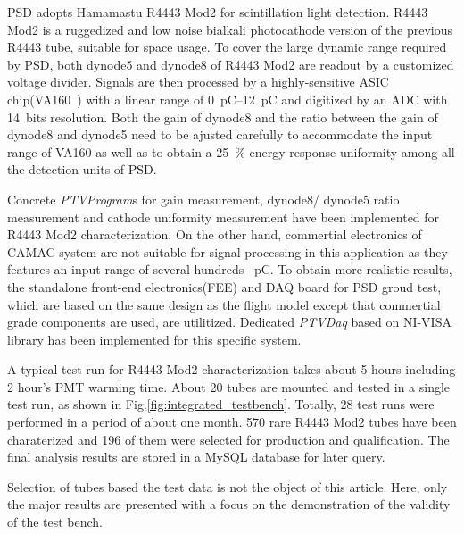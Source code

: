\documentclass[5p, times]{elsarticle}
\begin{document}
PSD adopts Hamamastu R4443 Mod2 for scintillation light detection.
R4443 Mod2 is a ruggedized and low noise bialkali photocathode version of the previous R4443 tube, suitable for space usage. 
To cover the large dynamic range required by PSD, both dynode5 and dynode8 of R4443 Mod2 are readout by a customized voltage divider.
Signals are then processed by a highly-sensitive ASIC chip(VA160~\cite{va160}) with a linear range of \SIrange{0}{12}{\pico\coulomb} and digitized by an ADC with 14~bits resolution.
Both the gain of dynode8 and the ratio between the gain of dynode8 and dynode5 need to be ajusted carefully to accommodate the input range of VA160 as well as to obtain a \SI{25}{\percent} energy response uniformity among all the detection units of PSD.

Concrete \textit{PTVProgram}s for gain measurement, dynode8/ dynode5 ratio measurement and cathode uniformity measurement have been implemented for R4443 Mod2 characterization.
On the other hand, commertial electronics of CAMAC system are not suitable for signal processing in this application as they features an input range of several hundreds \SI{}{\pico\coulomb}.
To obtain more realistic results, the standalone front-end electronics(FEE) and DAQ board for PSD groud test, which are based on the same design as the flight model except that commertial grade components are used, are utilitized.
Dedicated \textit{PTVDaq} based on NI-VISA library has been implemented for this specific system.

A typical test run for R4443 Mod2 characterization takes about 5 hours including 2 hour's PMT warming time.
About 20 tubes are mounted and tested in a single test run, as shown in Fig.\ref{fig:integrated_testbench}.
Totally, 28 test runs were performed in a period of about one month.
570 rare R4443 Mod2 tubes have been charaterized and 196 of them were selected for production and qualification.
The final analysis results are stored in a MySQL database for later query.

Selection of tubes based the test data is not the object of this article.
Here, only the major results are presented with a focus on the demonstration of the validity of the test bench. 
\end{document}
